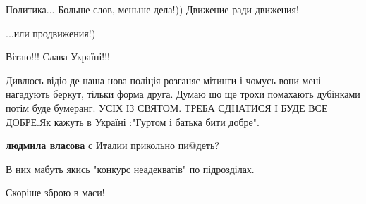 \begin{itemize}
Политика...
Больше слов, меньше дела!))
Движение ради движения!

\begin{itemize}
 
...или продвижения!)

\end{itemize}

 
Вітаю!!!
Слава Україні!!!

 

Дивлюсь відіо де наша нова поліція розганяє мітинги і чомусь вони мені
нагадують беркут, тільки форма друга. Думаю що ще трохи помахають дубінками
потім буде бумеранг. УСІХ ІЗ СВЯТОМ. ТРЕБА ЄДНАТИСЯ І БУДЕ ВСЕ ДОБРЕ.Як кажуть
в Україні :"Гуртом і батька бити добре".

\begin{itemize}
 
\textbf{людмила власова} с Италии прикольно пи@деть?🤣
\end{itemize}

 
В них мабуть якись "конкурс неадекватів" по підрозділах. \Smiley[1.0][yellow]

 
Скоріше зброю в маси!



\end{itemize}

